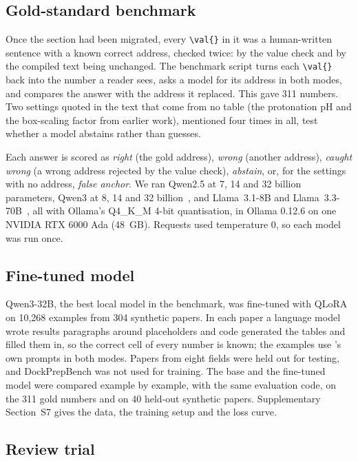 \subsection{Gold-standard benchmark}

Once the section had been migrated, every \texttt{\textbackslash val\{\}} in it was a
human-written sentence with a known correct address, checked twice: by the value check and by the
compiled text being unchanged. The benchmark script turns each \texttt{\textbackslash val\{\}}
back into the number a reader sees, asks a model for its address in both modes, and compares the
answer with the address it replaced. This gave 311 numbers. Two settings quoted in the text that
come from no table (the protonation pH and the box-scaling factor from earlier work), mentioned
four times in all, test whether a model abstains rather than guesses.

Each answer is scored as \emph{right} (the gold address), \emph{wrong} (another address),
\emph{caught wrong} (a wrong address rejected by the value check), \emph{abstain}, or, for the
settings with no address, \emph{false anchor}. We ran Qwen2.5 at 7, 14 and 32 billion parameters,
Qwen3 at 8, 14 and 32 billion~\cite{yang2025qwen3}, and Llama~3.1-8B and Llama~3.3-70B~\cite{grattafiori2024llama3},
all with Ollama's Q4\_K\_M 4-bit quantisation, in Ollama 0.12.6 on one NVIDIA RTX 6000 Ada
(48~GB). Requests used temperature 0, so each model was run once.

\subsection{Fine-tuned model}
\label{sec:eval-finetune}

Qwen3-32B, the best local model in the benchmark, was fine-tuned with QLoRA~\cite{dettmers2023qlora}
on 10,268 examples from 304 synthetic papers. In each paper a language model wrote results
paragraphs around placeholders and code generated the tables and filled them in, so the correct
cell of every number is known; the examples use \pv{}'s own prompts in both modes. Papers from
eight fields were held out for testing, and DockPrepBench was not used for training. The base and
the fine-tuned model were compared example by example, with the same evaluation code, on the 311
gold numbers and on 40 held-out synthetic papers. Supplementary Section~S7 gives the data, the
training setup and the loss curve.

\subsection{Review trial}
\label{sec:eval-review}

